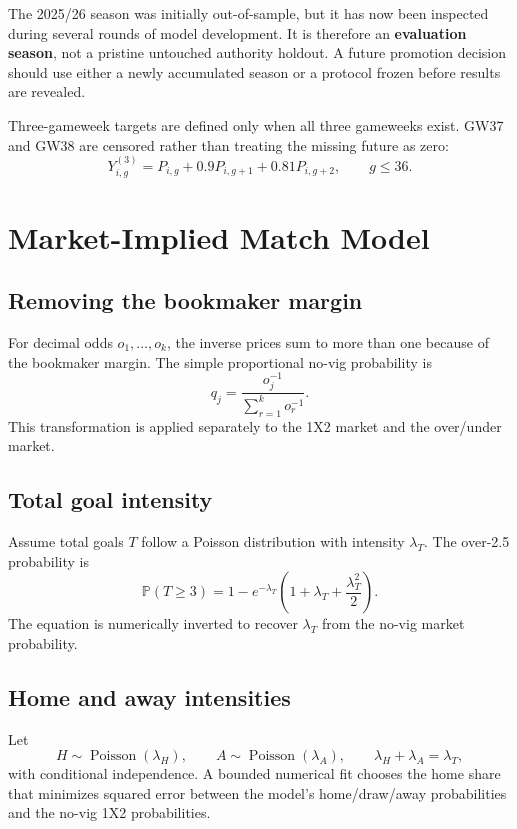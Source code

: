 \documentclass[11pt,a4paper]{article}
\newcommand{\Prob}{\mathbb{P}}
\begin{document}
The 2025/26 season was initially out-of-sample, but it has now been inspected during several rounds of model development. It is therefore an \textbf{evaluation season}, not a pristine untouched authority holdout. A future promotion decision should use either a newly accumulated season or a protocol frozen before results are revealed.

Three-gameweek targets are defined only when all three gameweeks exist. GW37 and GW38 are censored rather than treating the missing future as zero:
\begin{equation}
  Y^{(3)}_{i,g}=P_{i,g}+0.9P_{i,g+1}+0.81P_{i,g+2},\qquad g\leq 36.
\end{equation}

\section{Market-Implied Match Model}

\subsection{Removing the bookmaker margin}

For decimal odds $o_1,\ldots,o_k$, the inverse prices sum to more than one because of the bookmaker margin. The simple proportional no-vig probability is
\begin{equation}
  q_j=\frac{o_j^{-1}}{\sum_{r=1}^{k}o_r^{-1}}.
\end{equation}
This transformation is applied separately to the 1X2 market and the over/under market.

\subsection{Total goal intensity}

Assume total goals $T$ follow a Poisson distribution with intensity $\lambda_T$. The over-2.5 probability is
\begin{equation}
  \Prob(T\geq 3)=1-e^{-\lambda_T}\left(1+\lambda_T+\frac{\lambda_T^2}{2}\right).
\end{equation}
The equation is numerically inverted to recover $\lambda_T$ from the no-vig market probability.

\subsection{Home and away intensities}

Let
\begin{equation}
  H\sim\operatorname{Poisson}(\lambda_H),\qquad
  A\sim\operatorname{Poisson}(\lambda_A),\qquad
  \lambda_H+\lambda_A=\lambda_T,
\end{equation}
with conditional independence. A bounded numerical fit chooses the home share that minimizes squared error between the model's home/draw/away probabilities and the no-vig 1X2 probabilities.
\end{document}

